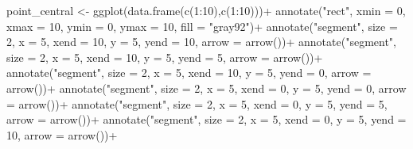 \documentclass[
  letterpaper,
  DIV=11,
  numbers=noendperiod]{scrreprt}
\newenvironment{Shaded}{\begin{snugshade}}{\end{snugshade}}
\newcommand{\AttributeTok}[1]{\textcolor[rgb]{0.40,0.45,0.13}{#1}}
\newcommand{\DecValTok}[1]{\textcolor[rgb]{0.68,0.00,0.00}{#1}}
\newcommand{\FunctionTok}[1]{\textcolor[rgb]{0.28,0.35,0.67}{#1}}
\newcommand{\NormalTok}[1]{\textcolor[rgb]{0.00,0.23,0.31}{#1}}
\newcommand{\OtherTok}[1]{\textcolor[rgb]{0.00,0.23,0.31}{#1}}
\newcommand{\SpecialCharTok}[1]{\textcolor[rgb]{0.37,0.37,0.37}{#1}}
\newcommand{\StringTok}[1]{\textcolor[rgb]{0.13,0.47,0.30}{#1}}
\begin{document}
\begin{Shaded}
\begin{Highlighting}[]
\NormalTok{point\_central }\OtherTok{\textless{}{-}} \FunctionTok{ggplot}\NormalTok{(}\FunctionTok{data.frame}\NormalTok{(}\FunctionTok{c}\NormalTok{(}\DecValTok{1}\SpecialCharTok{:}\DecValTok{10}\NormalTok{),}\FunctionTok{c}\NormalTok{(}\DecValTok{1}\SpecialCharTok{:}\DecValTok{10}\NormalTok{)))}\SpecialCharTok{+}
  \FunctionTok{annotate}\NormalTok{(}\StringTok{"rect"}\NormalTok{, }\AttributeTok{xmin =} \DecValTok{0}\NormalTok{, }\AttributeTok{xmax =} \DecValTok{10}\NormalTok{, }\AttributeTok{ymin =} \DecValTok{0}\NormalTok{, }\AttributeTok{ymax =} \DecValTok{10}\NormalTok{, }\AttributeTok{fill =} \StringTok{"gray92"}\NormalTok{)}\SpecialCharTok{+}
  \FunctionTok{annotate}\NormalTok{(}\StringTok{"segment"}\NormalTok{, }\AttributeTok{size =} \DecValTok{2}\NormalTok{, }\AttributeTok{x =} \DecValTok{5}\NormalTok{, }\AttributeTok{xend =} \DecValTok{10}\NormalTok{, }\AttributeTok{y =} \DecValTok{5}\NormalTok{, }\AttributeTok{yend =} \DecValTok{10}\NormalTok{, }\AttributeTok{arrow =} \FunctionTok{arrow}\NormalTok{())}\SpecialCharTok{+}
  \FunctionTok{annotate}\NormalTok{(}\StringTok{"segment"}\NormalTok{, }\AttributeTok{size =} \DecValTok{2}\NormalTok{, }\AttributeTok{x =} \DecValTok{5}\NormalTok{, }\AttributeTok{xend =} \DecValTok{10}\NormalTok{, }\AttributeTok{y =} \DecValTok{5}\NormalTok{, }\AttributeTok{yend =} \DecValTok{5}\NormalTok{, }\AttributeTok{arrow =} \FunctionTok{arrow}\NormalTok{())}\SpecialCharTok{+}
  \FunctionTok{annotate}\NormalTok{(}\StringTok{"segment"}\NormalTok{, }\AttributeTok{size =} \DecValTok{2}\NormalTok{, }\AttributeTok{x =} \DecValTok{5}\NormalTok{, }\AttributeTok{xend =} \DecValTok{10}\NormalTok{, }\AttributeTok{y =} \DecValTok{5}\NormalTok{, }\AttributeTok{yend =} \DecValTok{0}\NormalTok{, }\AttributeTok{arrow =} \FunctionTok{arrow}\NormalTok{())}\SpecialCharTok{+}
  \FunctionTok{annotate}\NormalTok{(}\StringTok{"segment"}\NormalTok{, }\AttributeTok{size =} \DecValTok{2}\NormalTok{, }\AttributeTok{x =} \DecValTok{5}\NormalTok{, }\AttributeTok{xend =} \DecValTok{0}\NormalTok{, }\AttributeTok{y =} \DecValTok{5}\NormalTok{, }\AttributeTok{yend =} \DecValTok{0}\NormalTok{, }\AttributeTok{arrow =} \FunctionTok{arrow}\NormalTok{())}\SpecialCharTok{+}
  \FunctionTok{annotate}\NormalTok{(}\StringTok{"segment"}\NormalTok{, }\AttributeTok{size =} \DecValTok{2}\NormalTok{, }\AttributeTok{x =} \DecValTok{5}\NormalTok{, }\AttributeTok{xend =} \DecValTok{0}\NormalTok{, }\AttributeTok{y =} \DecValTok{5}\NormalTok{, }\AttributeTok{yend =} \DecValTok{5}\NormalTok{, }\AttributeTok{arrow =} \FunctionTok{arrow}\NormalTok{())}\SpecialCharTok{+}
  \FunctionTok{annotate}\NormalTok{(}\StringTok{"segment"}\NormalTok{, }\AttributeTok{size =} \DecValTok{2}\NormalTok{, }\AttributeTok{x =} \DecValTok{5}\NormalTok{, }\AttributeTok{xend =} \DecValTok{0}\NormalTok{, }\AttributeTok{y =} \DecValTok{5}\NormalTok{, }\AttributeTok{yend =} \DecValTok{10}\NormalTok{, }\AttributeTok{arrow =} \FunctionTok{arrow}\NormalTok{())}\SpecialCharTok{+}

\end{Highlighting}
\end{Shaded}
\end{document}
